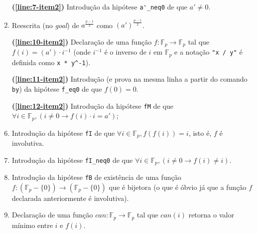 \begin{enumerate}[label=\textbf{\roman*.}]
\begin{enumerate}
                \item[\textbf{(\ref{line:7-item2})}] Introdução da hipótese \lstinline[language=coq]|a'_neq0| de que $a' \neq 0$.
                
                \item[\textbf{(\ref{line:9-item2})}] Reescrita (no \textit{goal}) de $a^{\frac{p-1}{2}}$ como $(a')^{\frac{p-1}{2}}$.
                
                \item[\textbf{(\ref{line:10-item2})}] Declaração de uma função $f : \mathbb{F}_p \rightarrow \mathbb{F}_p$ tal que $f(i) = (a') \cdot i^{-1}$ (onde $i^{-1}$ é o inverso de $i$ em $\mathbb{F}_p$ e a notação \lstinline[language=coq]|"x / y"| é definida como \lstinline[language=coq]|x * y^-1|).
                
                \item[\textbf{(\ref{line:11-item2})}] Introdução (e prova na mesma linha a partir do comando \lstinline[language=coq]|by|) da hipótese \lstinline[language=coq]|f_eq0| de que $f(0) = 0$.
                
                \item[\textbf{(\ref{line:12-item2})}] Introdução da hipótese \lstinline[language=coq]|fM| de que $\forall i \in \mathbb{F}_p, (i \neq 0 \rightarrow f(i) \cdot i = a')$;
                
                \item[\textbf{(\ref{line:14-item2})}] Introdução da hipótese \lstinline[language=coq]|fI| de que $\forall i \in \mathbb{F}_p, f(f(i)) = i$, isto é, $f$ é involutiva.
                
                \item[\textbf{(\ref{line:16-item2})}] Introdução da hipótese \lstinline[language=coq]|fI_neq0| de que $\forall i \in \mathbb{F}_p, (i \neq 0 \rightarrow f(i) \neq i)$.
                
                \item[\textbf{(\ref{line:18-item2})}] Introdução da hipótese \lstinline[language=coq]|fB| de existência de uma função $f : (\mathbb{F}_p - \{0\}) \rightarrow (\mathbb{F}_p - \{0\})$ que é bijetora (o que é óbvio já que a função $f$ declarada anteriormente é involutiva).
                
                \item[\textbf{(\ref{line:20-item2})}] Declaração de uma função $can : \mathbb{F}_p \rightarrow \mathbb{F}_p$ tal que $can(i)$ retorna o valor mínimo entre $i$ e $f(i)$.
        \end{enumerate}


\end{enumerate}
